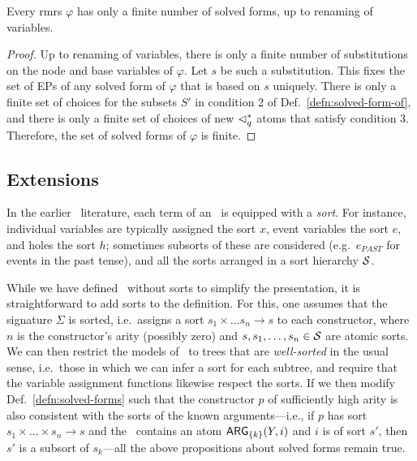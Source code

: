 \begin{prop}  \label{prop:finite-solved-forms}
  Every {\sc rmrs} $\varphi$ has only a finite number of solved forms, up to
  renaming of variables.
\end{prop}
\begin{proof}
  Up to renaming of variables, there is only a finite number of
  substitutions on the node and base variables of $\varphi$.  Let $s$
  be such a substitution.  This fixes the set of EPs of any solved
  form of $\varphi$ that is based on $s$ uniquely.  There is only a
  finite set of choices for the subsets $S'$ in condition 2 of
  Def.~\ref{defn:solved-form-of}, and there is only a finite set of
  choices of new $\lhd^*_q$ atoms that satisfy condition 3.  Therefore,
  the set of solved forms of $\varphi$ is finite.
\end{proof}




\subsection{Extensions}

In the earlier \rmrs\ literature, each term of an \rmrs\ is equipped
with a \emph{sort}.  For instance, individual variables are typically
assigned the sort $x$, event variables the sort $e$, and holes the
sort $h$; sometimes subsorts of these are considered (e.g.\ $e_{PAST}$
for events in the past tense), and all the sorts arranged in a sort
hierarchy ${\cal S}$.

While we have defined \rmrs\ without sorts to simplify the
presentation, it is straightforward to add sorts to the definition.
For this, one assumes that the signature $\Sigma$ is sorted, i.e.\
assigns a sort $s_1\times\ldots s_n\rightarrow s$ to each constructor,
where $n$ is the constructor's arity (possibly zero) and
$s,s_1,\ldots,s_n\in {\cal S}$ are atomic sorts.  We can then
restrict the models of \rmrs\ to trees that are \emph{well-sorted} in
the usual sense, i.e.\ those in which we can infer a sort for each
subtree, and require that the variable assignment functions likewise
respect the sorts.  If we then modify Def.~\ref{defn:solved-forms}
such that the constructor $p$ of sufficiently high arity is also
consistent with the sorts of the known arguments---i.e., if $p$ has
sort $s_1 \times \ldots \times s_n \rightarrow s$ and the \rmrs\
contains an atom $\mathsf{ARG}_{\{k\}}(Y,i)$ and $i$ is of sort $s'$, then
$s'$ is a subsort of $s_k$---all the above propositions about solved
forms remain true.

